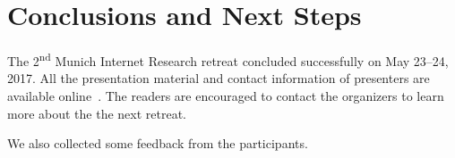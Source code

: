 \section{Conclusions and Next Steps}\label{sec:conclusion}


The 2\textsuperscript{nd} Munich Internet Research retreat concluded
successfully on May 23--24, 2017. All the presentation material and contact
information of presenters are available online~\cite{mir-materials}.  The
readers are encouraged to contact the organizers to learn more about the the
next retreat.

We also collected some feedback from the participants.







